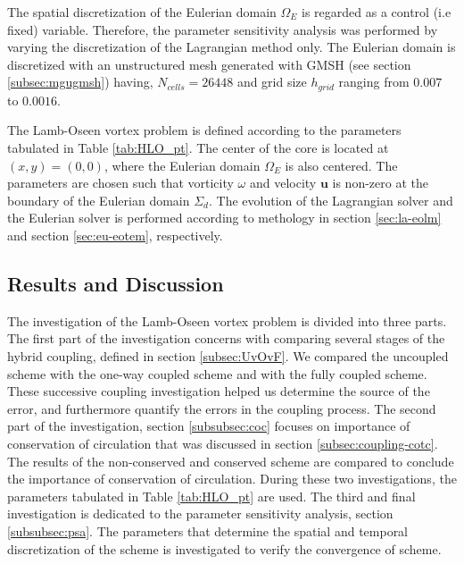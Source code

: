 The spatial discretization of the Eulerian domain $\Omega_E$ is regarded as a control (i.e fixed) variable. Therefore, the parameter sensitivity analysis was performed by varying the discretization of the Lagrangian method only. The Eulerian domain is discretized with an unstructured mesh generated with GMSH (see section \ref{subsec:mgugmsh}) having, $N_{cells} = 26448$  and grid size $h_{grid}$ ranging from $0.007$ to $0.0016$. 

The Lamb-Oseen vortex problem is defined according to the parameters tabulated in Table \ref{tab:HLO_pt}. The center of the core is located at $(x,y)=(0,0)$, where the Eulerian domain $\Omega_E$ is also centered. The parameters are chosen such that vorticity $\omega$ and velocity $\mathbf{u}$ is non-zero at the boundary of the Eulerian domain $\Sigma_d$. The evolution of the Lagrangian solver and the Eulerian solver is performed according to methology in section \ref{sec:la-eolm} and section \ref{sec:eu-eotem}, respectively.


\subsection{Results and Discussion}

The investigation of the Lamb-Oseen vortex problem is divided into three parts. The first part of the investigation concerns with comparing several stages of the hybrid coupling, defined in section \ref{subsec:UvOvF}. We compared the uncoupled scheme with the one-way coupled scheme and with the fully coupled scheme. These successive coupling investigation helped us determine the source of the error, and furthermore quantify the errors in the coupling process. The second part of the investigation, section \ref{subsubsec:coc} focuses on importance of conservation of circulation that was discussed in section \ref{subsec:coupling-cotc}. The results of the non-conserved and conserved scheme are compared to conclude the importance of conservation of circulation. During these two investigations, the parameters tabulated in Table \ref{tab:HLO_pt} are used. The third and final investigation is dedicated to the parameter sensitivity analysis, section \ref{subsubsec:psa}. The parameters that determine the spatial and temporal discretization of the scheme is investigated to verify the convergence of scheme.

